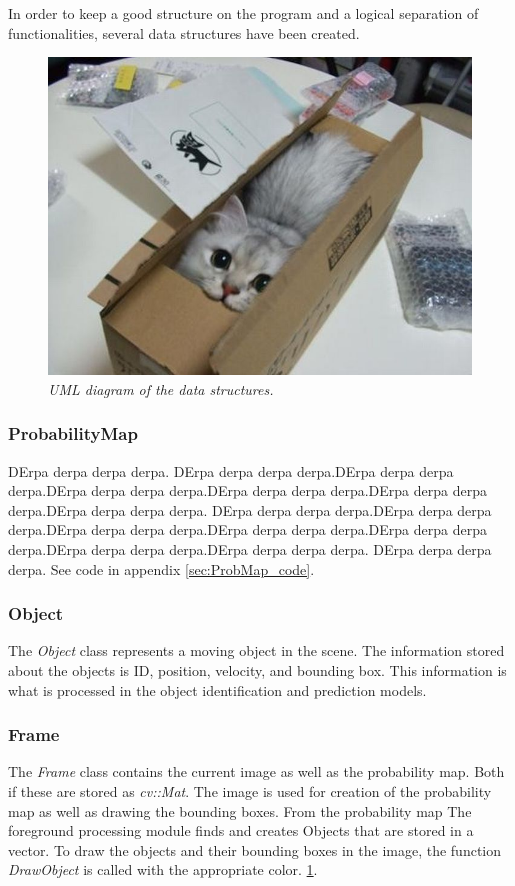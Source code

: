 In order to keep a good structure on the program and a logical separation of functionalities, several data structures have been created.

\begin{figure}[htb]
	\centering
	\includegraphics[width=\linewidth]{images/acatisfinetoo}
	\caption{\textit{UML diagram of the data structures.}}
	\label{fig:UML_fig} %
\end{figure}

\subsubsection{ProbabilityMap}
DErpa derpa derpa derpa. DErpa derpa derpa derpa.DErpa derpa derpa derpa.DErpa derpa derpa derpa.DErpa derpa derpa derpa.DErpa derpa derpa derpa.DErpa derpa derpa derpa.
DErpa derpa derpa derpa.DErpa derpa derpa derpa.DErpa derpa derpa derpa.DErpa derpa derpa derpa.DErpa derpa derpa derpa.DErpa derpa derpa derpa.DErpa derpa derpa derpa.
DErpa derpa derpa derpa. See code in appendix \ref{sec:ProbMap_code}. \cite{CVBook} %

\subsubsection{Object}
The \emph{Object} class represents a moving object in the scene. The information stored about the objects is ID, position, velocity, and bounding box. This information is what is processed in the object identification and prediction models. 

\subsubsection{Frame}
The \emph{Frame} class contains the current image as well as the probability map. Both if these are stored as \emph{cv::Mat}. The image is used for creation of the probability map as well as drawing the bounding boxes. From the probability map The foreground processing module finds and creates Objects that are stored in a vector. To draw the objects and their bounding boxes in the image, the function \emph{DrawObject} is called with the appropriate color. \ref{fig:UML_fig}. %

